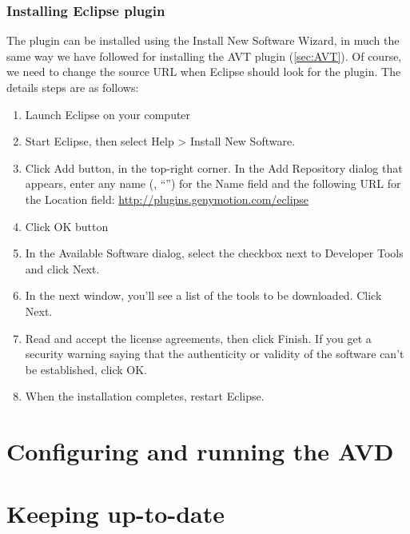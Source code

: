 \subsubsection{Installing \genymotion{} Eclipse plugin}

The plugin can be installed using the Install New Software Wizard, in much the
same way we have followed for installing the AVT plugin (\cref{sec:AVT}). Of course, we need to change the
source URL when Eclipse should look for the plugin. The details steps are as
follows:
 \begin{enumerate}
   \item Launch Eclipse on your computer
   \item Start Eclipse, then select Help > Install New Software.
    \item Click Add button, in the top-right corner.  In the Add Repository dialog that
       appears, enter any name (\eg, ``\genymotion{}'') for the Name field and the following URL for the
      Location field: \url{http://plugins.genymotion.com/eclipse}
   \item Click OK button
   \item In the Available Software dialog, select the checkbox next to
      Developer Tools and click Next.
   \item In the next window, you'll see a list of the tools to be downloaded.
      Click Next.
   \item Read and accept the license agreements, then click Finish.
      If you get a security warning saying that the authenticity or validity of
      the software can't be established, click OK.
   \item When the installation completes, restart Eclipse.
\end{enumerate}

     
\section{Configuring and running the AVD\label{sec:AVD}}

\section{Keeping up-to-date\label{sec:keeping_updated}}
